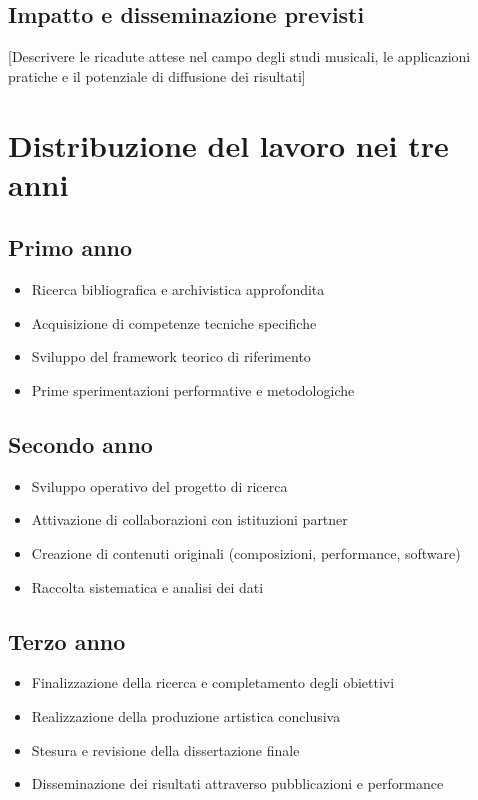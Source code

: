 \documentclass[11pt,a4paper]{article}
\begin{document}
\subsection{Impatto e disseminazione previsti}
[Descrivere le ricadute attese nel campo degli studi musicali, le applicazioni pratiche e il potenziale di diffusione dei risultati]

\section{Distribuzione del lavoro nei tre anni}

\subsection{Primo anno}
\begin{itemize}[leftmargin=1cm]
    \item Ricerca bibliografica e archivistica approfondita
    \item Acquisizione di competenze tecniche specifiche
    \item Sviluppo del framework teorico di riferimento
    \item Prime sperimentazioni performative e metodologiche
\end{itemize}

\subsection{Secondo anno}
\begin{itemize}[leftmargin=1cm]
    \item Sviluppo operativo del progetto di ricerca
    \item Attivazione di collaborazioni con istituzioni partner
    \item Creazione di contenuti originali (composizioni, performance, software)
    \item Raccolta sistematica e analisi dei dati
\end{itemize}

\subsection{Terzo anno}
\begin{itemize}[leftmargin=1cm]
    \item Finalizzazione della ricerca e completamento degli obiettivi
    \item Realizzazione della produzione artistica conclusiva
    \item Stesura e revisione della dissertazione finale
    \item Disseminazione dei risultati attraverso pubblicazioni e performance
\end{itemize}
\end{document}
